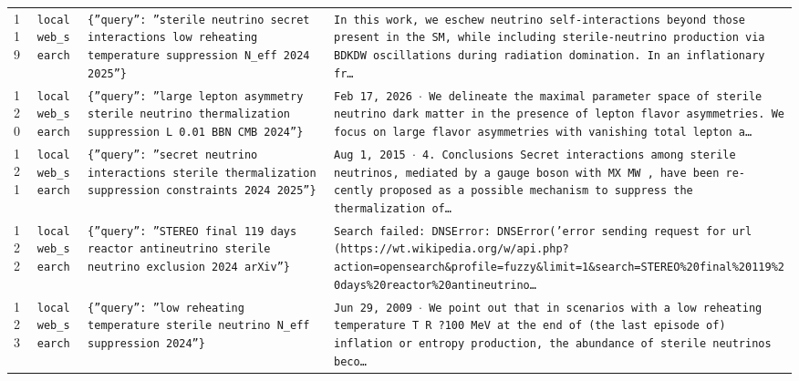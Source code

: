 \documentclass[11pt,a4paper]{article}
\begin{document}
\begin{longtable}{@{}p{}p{}p{}p{}@{}}
119 & \texttt{local}\newline\texttt{web\_\allowbreak{}search} & \texttt{\{''query'':\allowbreak{} ''sterile neutrino secret interactions low reheating temperature suppression N\_\allowbreak{}eff 2024 2025''\}\allowbreak{}} & \texttt{In this work,\allowbreak{} we eschew neutrino self-interactions beyond those present in the SM,\allowbreak{} while including sterile-neutrino production via BDKDW oscillations during radiation domination. In an inflationary fr\ldots{}\allowbreak{}} \\
120 & \texttt{local}\newline\texttt{web\_\allowbreak{}search} & \texttt{\{''query'':\allowbreak{} ''large lepton asymmetry sterile neutrino thermalization suppression L 0.01 BBN CMB 2024''\}\allowbreak{}} & \texttt{Feb 17,\allowbreak{} 2026 $\cdot$ We delineate the maximal parameter space of sterile neutrino dark matter in the presence of lepton flavor asymmetries. We focus on large flavor asymmetries with vanishing total lepton a\ldots{}\allowbreak{}} \\
121 & \texttt{local}\newline\texttt{web\_\allowbreak{}search} & \texttt{\{''query'':\allowbreak{} ''secret neutrino interactions sterile thermalization suppression constraints 2024 2025''\}\allowbreak{}} & \texttt{Aug 1,\allowbreak{} 2015 $\cdot$ 4. Conclusions Secret interactions among sterile neutrinos,\allowbreak{} mediated by a gauge boson with MX MW ,\allowbreak{} have been re- cently proposed as a possible mechanism to suppress the thermalization of\ldots{}\allowbreak{}} \\
122 & \texttt{local}\newline\texttt{web\_\allowbreak{}search} & \texttt{\{''query'':\allowbreak{} ''STEREO final 119 days reactor antineutrino sterile neutrino exclusion 2024 arXiv''\}\allowbreak{}} & \texttt{Search failed:\allowbreak{} DNSError:\allowbreak{} DNSError('error sending request for url (https:\allowbreak{}/\allowbreak{}/\allowbreak{}wt.wikipedia.org/\allowbreak{}w/\allowbreak{}api.php?action=\allowbreak{}opensearch\&profile=\allowbreak{}fuzzy\&limit=\allowbreak{}1\&search=\allowbreak{}STEREO\%20final\%20119\%20days\%20reactor\%20antineutrino\ldots{}\allowbreak{}} \\
123 & \texttt{local}\newline\texttt{web\_\allowbreak{}search} & \texttt{\{''query'':\allowbreak{} ''low reheating temperature sterile neutrino N\_\allowbreak{}eff suppression 2024''\}\allowbreak{}} & \texttt{Jun 29,\allowbreak{} 2009 $\cdot$ We point out that in scenarios with a low reheating temperature T R ?100 MeV at the end of (the last episode of)\allowbreak{} inflation or entropy production,\allowbreak{} the abundance of sterile neutrinos beco\ldots{}\allowbreak{}} \\

\end{longtable}
\end{document}
